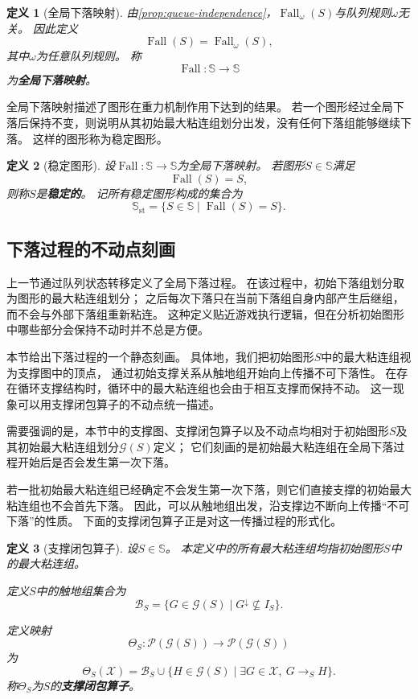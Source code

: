 \documentclass[UTF8,fontset=none]{ctexart}
\theoremstyle{cnthm}
\newtheorem{definition}{定义}[section]
\begin{document}
			\begin{definition}[全局下落映射]
				由\cref{prop:queue-independence}，$\operatorname{Fall}_{\omega}(S)$与队列规则$\omega$无关。
				因此定义
				$$
				\operatorname{Fall}(S)=\operatorname{Fall}_{\omega}(S),
				$$
				其中$\omega$为任意队列规则。
				称
				$$
				\operatorname{Fall}:\mathbb{S}\to\mathbb{S}
				$$
				为\textbf{全局下落映射}。
			\end{definition}
			
			全局下落映射描述了图形在重力机制作用下达到的结果。
			若一个图形经过全局下落后保持不变，则说明从其初始最大粘连组划分出发，没有任何下落组能够继续下落。
			这样的图形称为稳定图形。
			
			\begin{definition}[稳定图形]
				设$\operatorname{Fall}:\mathbb{S}\to\mathbb{S}$为全局下落映射。
				若图形$S\in\mathbb{S}$满足
				$$
				\operatorname{Fall}(S)=S,
				$$
				则称$S$是\textbf{稳定的}。
				记所有稳定图形构成的集合为
				$$
				\mathbb{S}_{\mathrm{st}}
				=
				\{S\in\mathbb{S}\mid \operatorname{Fall}(S)=S\}.
				$$
			\end{definition}
					
		\subsection{下落过程的不动点刻画}
			
			上一节通过队列状态转移定义了全局下落过程。
			在该过程中，初始下落组划分取为图形的最大粘连组划分；
			之后每次下落只在当前下落组自身内部产生后继组，而不会与外部下落组重新粘连。
			这种定义贴近游戏执行逻辑，但在分析初始图形中哪些部分会保持不动时并不总是方便。
			
			本节给出下落过程的一个静态刻画。
			具体地，我们把初始图形$S$中的最大粘连组视为支撑图中的顶点，
			通过初始支撑关系从触地组开始向上传播不可下落性。
			在存在循环支撑结构时，循环中的最大粘连组也会由于相互支撑而保持不动。
			这一现象可以用支撑闭包算子的不动点统一描述。
			
			需要强调的是，本节中的支撑图、支撑闭包算子以及不动点均相对于初始图形$S$及其初始最大粘连组划分$\mathcal{G}(S)$定义；
			它们刻画的是初始最大粘连组在全局下落过程开始后是否会发生第一次下落。
			
			若一批初始最大粘连组已经确定不会发生第一次下落，则它们直接支撑的初始最大粘连组也不会首先下落。			
			因此，可以从触地组出发，沿支撑边不断向上传播“不可下落”的性质。
			下面的支撑闭包算子正是对这一传播过程的形式化。
			
			\begin{definition}[支撑闭包算子]
				设$S\in\mathbb{S}$。
				本定义中的所有最大粘连组均指初始图形$S$中的最大粘连组。
				
				定义$S$中的触地组集合为
				$$
				\mathcal{B}_S
				=
				\{G\in\mathcal{G}(S)\mid G^\downarrow\not\subseteq I_S\}.
				$$
				
				定义映射
				$$
				\Theta_S:\mathcal{P}(\mathcal{G}(S))\to \mathcal{P}(\mathcal{G}(S))
				$$
				为
				$$
				\Theta_S(\mathcal{X})
				=
				\mathcal{B}_S
				\cup
				\{H\in\mathcal{G}(S)\mid \exists G\in\mathcal{X},\ G\to_S H\}.
				$$
				称$\Theta_S$为$S$的\textbf{支撑闭包算子}。
			\end{definition}
			
\end{document}
